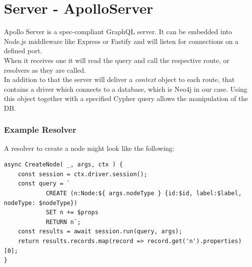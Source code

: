 \section{Server - ApolloServer}
Apollo Server is a spec-compliant GraphQL server. It can be embedded into Node.js middleware like Express or Fastify \cite{ApolloServerIntro} and will listen for connections on a defined port. \\
When it receives one it will read the query and call the respective route, or resolvers as they are called. \\
In addition to that the server will deliver a \emph{context} object to each route, that contains a driver which connects to a database, which is Neo4j in our case. Using this object together with a specified Cypher query allows the manipulation of the DB. 

\subsubsection{Example Resolver}
A resolver to create a node might look like the following:

\lstset{language=JavaScript}
\begin{lstlisting}[caption={A Basic Resolver},label={ex241}]
async CreateNode( _, args, ctx ) { 
	const session = ctx.driver.session(); 
	const query = ` 
			CREATE (n:Node:${ args.nodeType } {id:$id, label:$label, nodeType: $nodeType}) 
			SET n += $props 
			RETURN n`; 
	const results = await session.run(query, args);
	return results.records.map(record => record.get('n').properties)[0]; 
}
\end{lstlisting}

